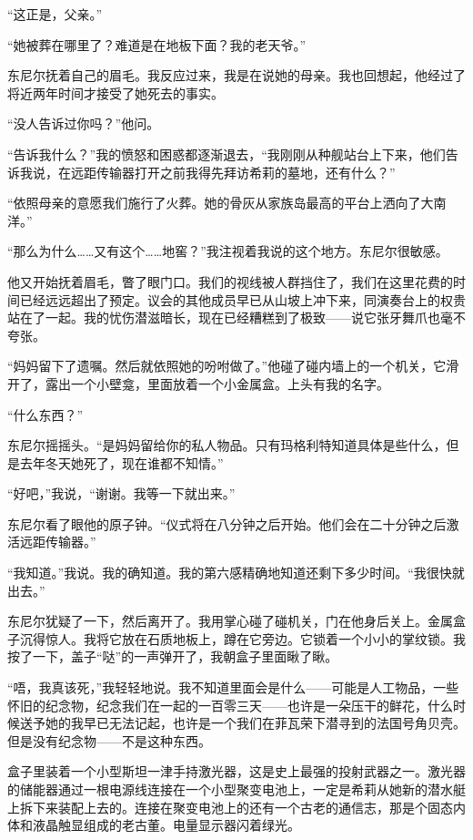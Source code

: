\documentclass[AutoFakeBold=true]{book}
\begin{document}
``这正是，父亲。''

``她被葬在哪里了？难道是在地板下面？我的老天爷。''

东尼尔抚着自己的眉毛。我反应过来，我是在说她的母亲。我也回想起，他经过了将近两年时间才接受了她死去的事实。

``没人告诉过你吗？''他问。

``告诉我什么？''我的愤怒和困惑都逐渐退去，``我刚刚从种舰站台上下来，他们告诉我说，在远距传输器打开之前我得先拜访希莉的墓地，还有什么？''

``依照母亲的意愿我们施行了火葬。她的骨灰从家族岛最高的平台上洒向了大南洋。''

``那么为什么……又有这个……{\kaishu 地窖}？''我注视着我说的这个地方。东尼尔很敏感。

他又开始抚着眉毛，瞥了眼门口。我们的视线被人群挡住了，我们在这里花费的时间已经远远超出了预定。议会的其他成员早已从山坡上冲下来，同演奏台上的权贵站在了一起。我的忧伤潜滋暗长，现在已经糟糕到了极致——说它张牙舞爪也毫不夸张。

``妈妈留下了遗嘱。然后就依照她的吩咐做了。''他碰了碰内墙上的一个机关，它滑开了，露出一个小壁龛，里面放着一个小金属盒。上头有我的名字。

``什么东西？''

东尼尔摇摇头。``是妈妈留给你的私人物品。只有玛格利特知道具体是些什么，但是去年冬天她死了，现在谁都不知情。''

``好吧，''我说，``谢谢。我等一下就出来。''

东尼尔看了眼他的原子钟。``仪式将在八分钟之后开始。他们会在二十分钟之后激活远距传输器。''

``我知道。''我说。我的确知道。我的第六感精确地知道还剩下多少时间。``我很快就出去。''

东尼尔犹疑了一下，然后离开了。我用掌心碰了碰机关，门在他身后关上。金属盒子沉得惊人。我将它放在石质地板上，蹲在它旁边。它锁着一个小小的掌纹锁。我按了一下，盖子``哒''的一声弹开了，我朝盒子里面瞅了瞅。

``唔，我真该死，''我轻轻地说。我不知道里面会是什么——可能是人工物品，一些怀旧的纪念物，纪念我们在一起的一百零三天——也许是一朵压干的鲜花，什么时候送予她的我早已无法记起，也许是一个我们在菲瓦荣下潜寻到的法国号角贝壳。但是没有纪念物——不是这种东西。

盒子里装着一个小型斯坦一津手持激光器，这是史上最强的投射武器之一。激光器的储能器通过一根电源线连接在一个小型聚变电池上，一定是希莉从她新的潜水艇上拆下来装配上去的。连接在聚变电池上的还有一个古老的通信志，那是个固态内体和液晶触显组成的老古董。电量显示器闪着绿光。
\end{document}
